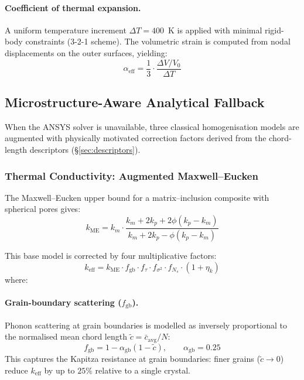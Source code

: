 \documentclass[11pt,a4paper]{article}
\begin{document}
\paragraph{Coefficient of thermal expansion.}
A uniform temperature increment $\Delta T = 400$~\si{K} is applied with minimal rigid-body constraints (3-2-1 scheme). The volumetric strain is computed from nodal displacements on the outer surfaces, yielding:
\begin{equation}
    \alpha_{\text{eff}} = \frac{1}{3} \cdot \frac{\Delta V / V_0}{\Delta T}
    \label{eq:cte}
\end{equation}

\subsection{Microstructure-Aware Analytical Fallback}
\label{sec:fallback}

When the ANSYS solver is unavailable, three classical homogenisation models are augmented with physically motivated correction factors derived from the chord-length descriptors (\S\ref{sec:descriptors}).

\subsubsection{Thermal Conductivity: Augmented Maxwell--Eucken}

The Maxwell--Eucken upper bound for a matrix--inclusion composite with spherical pores gives:
\begin{equation}
    k_{\text{ME}} = k_m \cdot \frac{k_m + 2k_p + 2\phi(k_p - k_m)}{k_m + 2k_p - \phi(k_p - k_m)}
    \label{eq:maxwell}
\end{equation}

This base model is corrected by four multiplicative factors:
\begin{equation}
    k_{\text{eff}} = k_{\text{ME}} \cdot f_{\text{gb}} \cdot f_{\tau} \cdot f_{\sigma^2} \cdot f_{N_s} \cdot (1 + \eta_k)
    \label{eq:k_corrected}
\end{equation}
where:

\paragraph{Grain-boundary scattering ($f_{\text{gb}}$).}
Phonon scattering at grain boundaries is modelled as inversely proportional to the normalised mean chord length $\tilde{c} = \bar{c}_{\text{avg}} / N$:
\begin{equation}
    f_{\text{gb}} = 1 - \alpha_{\text{gb}}(1 - \tilde{c}), \qquad \alpha_{\text{gb}} = 0.25
\end{equation}
This captures the Kapitza resistance at grain boundaries: finer grains ($\tilde{c} \to 0$) reduce $k_{\text{eff}}$ by up to $25\%$ relative to a single crystal.
\end{document}
